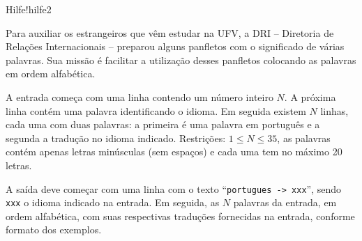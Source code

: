 \documentclass[12pt,a4paper,oneside]{article}
\begin{document}
\begin{problem}{Hilfe!}{hilfe}{2}

Para auxiliar os estrangeiros que vêm estudar na UFV, a DRI – Diretoria de Relações Internacionais –  preparou alguns panfletos com o significado de várias palavras. Sua missão é facilitar a utilização desses panfletos colocando as palavras em ordem alfabética.

%

\InputFile

A entrada começa com uma linha contendo um número inteiro $N$. A próxima linha contém uma palavra identificando o idioma. Em seguida existem $N$ linhas, cada uma com duas palavras: a primeira é uma palavra em português e a segunda a tradução no idioma indicado. Restrições: $1 \leq N \leq 35$, as palavras contém apenas letras minúsculas (sem espaços) e cada uma tem no máximo 20 letras.

\OutputFile

A saída deve começar com uma linha com o texto ``\texttt{portugues -> xxx}'', sendo \texttt{xxx} o idioma indicado na entrada. Em seguida, as $N$ palavras da entrada, em ordem alfabética, com suas respectivas traduções fornecidas na entrada, conforme formato dos exemplos.


\Example

\begin{example}
%
\end{example}

\begin{example}
%
\end{example}




\end{problem}
\end{document}
